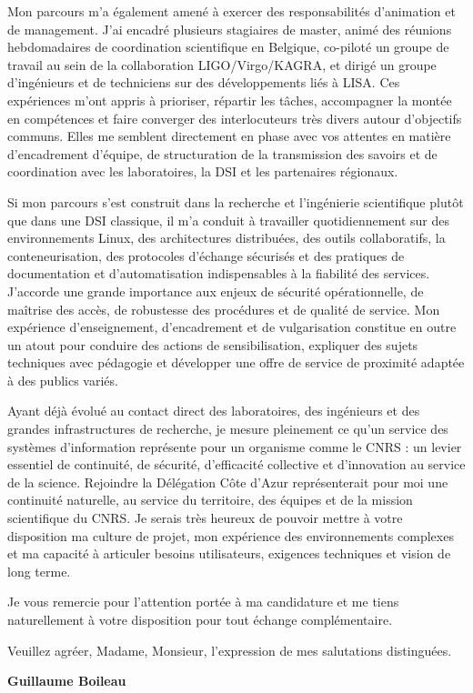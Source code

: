 \documentclass[10pt,a4paper]{altacv}
\begin{document}
{Mon parcours m’a également amené à exercer des responsabilités d’animation et de management. J’ai encadré plusieurs stagiaires de master, animé des réunions hebdomadaires de coordination scientifique en Belgique, co-piloté un groupe de travail au sein de la collaboration LIGO/Virgo/KAGRA, et dirigé un groupe d’ingénieurs et de techniciens sur des développements liés à LISA. Ces expériences m’ont appris à prioriser, répartir les tâches, accompagner la montée en compétences et faire converger des interlocuteurs très divers autour d’objectifs communs. Elles me semblent directement en phase avec vos attentes en matière d’encadrement d’équipe, de structuration de la transmission des savoirs et de coordination avec les laboratoires, la DSI et les partenaires régionaux.

Si mon parcours s’est construit dans la recherche et l’ingénierie scientifique plutôt que dans une DSI classique, il m’a conduit à travailler quotidiennement sur des environnements Linux, des architectures distribuées, des outils collaboratifs, la conteneurisation, des protocoles d’échange sécurisés et des pratiques de documentation et d’automatisation indispensables à la fiabilité des services. J’accorde une grande importance aux enjeux de sécurité opérationnelle, de maîtrise des accès, de robustesse des procédures et de qualité de service. Mon expérience d’enseignement, d’encadrement et de vulgarisation constitue en outre un atout pour conduire des actions de sensibilisation, expliquer des sujets techniques avec pédagogie et développer une offre de service de proximité adaptée à des publics variés.

Ayant déjà évolué au contact direct des laboratoires, des ingénieurs et des grandes infrastructures de recherche, je mesure pleinement ce qu’un service des systèmes d’information représente pour un organisme comme le CNRS : un levier essentiel de continuité, de sécurité, d’efficacité collective et d’innovation au service de la science. Rejoindre la Délégation Côte d’Azur représenterait pour moi une continuité naturelle, au service du territoire, des équipes et de la mission scientifique du CNRS. Je serais très heureux de pouvoir mettre à votre disposition ma culture de projet, mon expérience des environnements complexes et ma capacité à articuler besoins utilisateurs, exigences techniques et vision de long terme.

Je vous remercie pour l’attention portée à ma candidature et me tiens naturellement à votre disposition pour tout échange complémentaire.

Veuillez agréer, Madame, Monsieur, l’expression de mes salutations distinguées.

\textbf{Guillaume Boileau}

}

\end{document}

